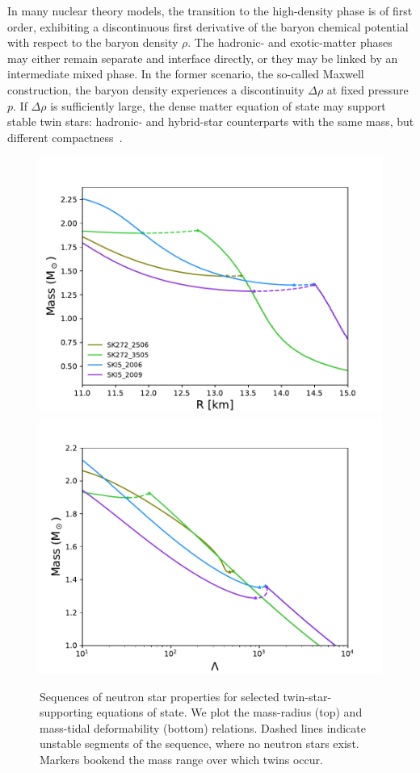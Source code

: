 \documentclass[aps,prd,twocolumn,superscriptaddress,nofootinbib]{revtex4-1}
\begin{document}
In many nuclear theory models, the transition to the high-density phase is of first order, exhibiting a discontinuous first derivative of the baryon chemical potential with respect to the baryon density $\rho$. The hadronic- and exotic-matter phases may either remain separate and interface directly, or they may be linked by an intermediate mixed phase. In the former scenario, the so-called Maxwell construction, the baryon density experiences a discontinuity $\Delta\rho$ at fixed pressure $p$.  
If $\Delta\rho$ is sufficiently large, the dense matter equation of state may support stable twin stars: hadronic- and hybrid-star counterparts with the same mass, but different compactness~\cite{Schaffner-BielichHanauske2002, ZacchiTolos2017, AlfordSedrakian2017, ChristianZacchi2018}.

\begin{figure}[t]
    \includegraphics[width=0.95\columnwidth,trim={10 0 10 40},clip]{M-R.pdf} \\ 
    \includegraphics[width=0.95\columnwidth,trim={10 0 10 30},clip]{M-L.pdf}
    \caption{Sequences of neutron star properties for selected twin-star-supporting equations of state. We plot the mass-radius (top) and mass-tidal deformability (bottom) relations. Dashed lines indicate unstable segments of the sequence, where no neutron stars exist. Markers bookend the mass range over which twins occur.}
    \label{fig:twins}
\end{figure}
\end{document}

